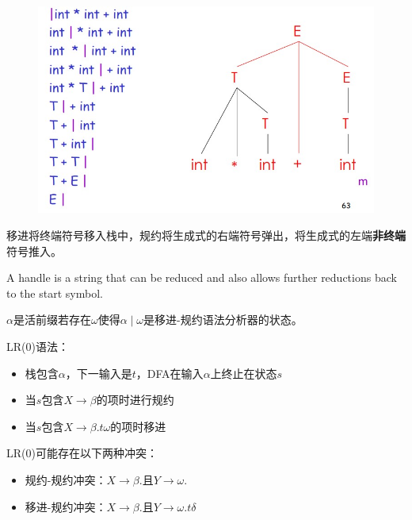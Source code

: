 \begin{figure}[H]
\centering
\includegraphics[width=0.8\linewidth]{fig/shift-reduce.jpg}
\end{figure}
移进将终端符号移入栈中，规约将生成式的右端符号弹出，将生成式的左端\textbf{非终端}符号推入。

\begin{definition}[句柄(handle)]
A handle is a string that can be reduced and also allows further reductions back to the start symbol.
\end{definition}

\begin{definition}
$\alpha$是活前缀若存在$\omega$使得$\alpha\mid\omega$是移进-规约语法分析器的状态。
\end{definition}

LR(0)语法：
\begin{itemize}
	\item 栈包含$\alpha$，下一输入是$t$，DFA在输入$\alpha$上终止在状态$s$
	\item 当$s$包含$X\to\beta$的项时进行规约
	\item 当$s$包含$X\to\beta.t\omega$的项时移进
\end{itemize}

LR(0)可能存在以下两种冲突：
\begin{itemize}
	\item 规约-规约冲突：$X\to\beta.$且$Y\to\omega.$
	\item 移进-规约冲突：$X\to\beta.$且$Y\to\omega.t\delta$
\end{itemize}

